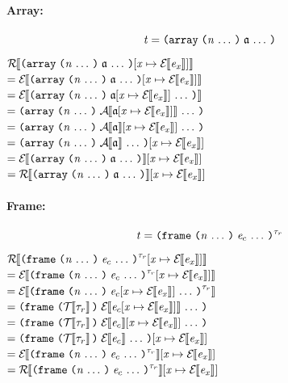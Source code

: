 \begin{sproof}
\paragraph{Array:}
\[\term = \arrlit{\sequence{\atom}}{\sequence{\nat}}\]
$\EraseTrm{\eexprsubst{\arrlit{\sequence{\atom}}{\sequence{\nat}}}}$ \\
$= \EraseE{\eexprsubst{\arrlit{\sequence{\atom}}{\sequence{\nat}}}}$ \\
$= \EraseE{\arrlit{\sequence{\eexprsubst{\atom}}}{\sequence{\nat}}}$ \\
$= \arrlit{\sequence{\EraseA{\eexprsubst{\atom}}}}{\sequence{\nat}}$ \\
$= \arrlit{\sequence{\eatomsubstE{\atom}}}{\sequence{\nat}}$ \\
$= \eexprsubst{\arrlit{\sequence{\EraseA{\atom}}}{\sequence{\nat}}}$ \\
$= \exprsubstE{\arrlit{\sequence{\atom}}{\sequence{\nat}}}$ \\
$= \etrmsubstE{\arrlit{\sequence{\atom}}{\sequence{\nat}}}$ \\

\paragraph{Frame:}
\[\term = \notedfrm[\type_r]{\sequence{\expr_c}}{\sequence{\nat}}\]
$\EraseTrm{\eexprsubst{\notedfrm[\type_r]{\sequence{\expr_c}}{\sequence{\nat}}}}$ \\
$= \EraseE{\eexprsubst{\notedfrm[\type_r]{\sequence{\expr_c}}{\sequence{\nat}}}}$ \\
$= \EraseE{\notedfrm[\type_r]{\sequence{\eexprsubst{\expr_c}}}{\sequence{\nat}}}$ \\
$= \frm{\sequence{\EraseE{\eexprsubst{\expr_c}}}}{\EraseT{\type_r}}$ \\
$= \frm{\sequence{\exprsubstE{\expr_c}}}{\EraseT{\type_r}}$ \\
$= \eexprsubst{\frm{\sequence{\EraseE{\expr_c}}}{\EraseT{\type_r}}}$ \\
$= \exprsubstE{\notedfrm[\type_r]{\sequence{\expr_c}}{\sequence{\nat}}}$ \\
$= \etrmsubstE{\notedfrm[\type_r]{\sequence{\expr_c}}{\sequence{\nat}}}$ \\


\end{sproof}
